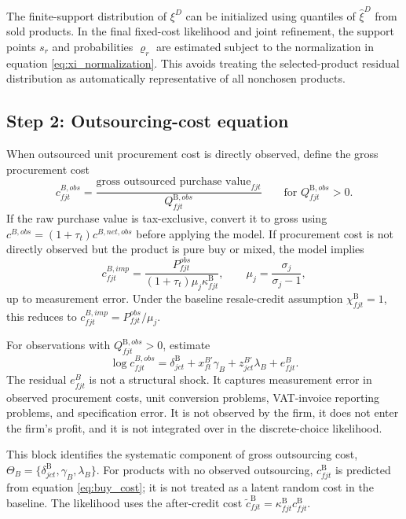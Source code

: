 \documentclass[11pt,a4paper]{article}
\newcommand{\B}{\mathrm{B}}
\begin{document}
The finite-support distribution of $\xi^D$ can be initialized using quantiles of $\widehat\xi^D$ from sold products. In the final fixed-cost likelihood and joint refinement, the support points $s_r$ and probabilities $\varrho_r$ are estimated subject to the normalization in equation \eqref{eq:xi_normalization}. This avoids treating the selected-product residual distribution as automatically representative of all nonchosen products.

\subsection{Step 2: Outsourcing-cost equation}

When outsourced unit procurement cost is directly observed, define the gross procurement cost
\begin{equation}
    c^{B,obs}_{fjt}=\frac{\text{gross outsourced purchase value}_{fjt}}{Q^{\B,obs}_{fjt}}
    \qquad\text{for }Q^{\B,obs}_{fjt}>0.
\end{equation}
If the raw purchase value is tax-exclusive, convert it to gross using $c^{B,obs}=(1+\tau_t)c^{B,net,obs}$ before applying the model. If procurement cost is not directly observed but the product is pure buy or mixed, the model implies
\begin{equation}
    c^{B,imp}_{fjt}
    =\frac{P^{obs}_{fjt}}{(1+\tau_t)\mu_j\kappa^{\B}_{fjt}},
    \qquad \mu_j=\frac{\sigma_j}{\sigma_j-1},
    \label{eq:cB_implied}
\end{equation}
up to measurement error. Under the baseline resale-credit assumption $\chi^{\B}_{fjt}=1$, this reduces to $c^{B,imp}_{fjt}=P^{obs}_{fjt}/\mu_j$.

For observations with $Q^{\B,obs}_{fjt}>0$, estimate
\begin{equation}
    \log c^{B,obs}_{fjt}
    =\delta^{\B}_{jct}
    +x^{B\prime}_{ft}\gamma_B
    +z^{B\prime}_{jct}\lambda_B
    +e^B_{fjt}.
    \label{eq:buy_cost_empirical}
\end{equation}
The residual $e^B_{fjt}$ is not a structural shock. It captures measurement error in observed procurement costs, unit conversion problems, VAT-invoice reporting problems, and specification error. It is not observed by the firm, it does not enter the firm's profit, and it is not integrated over in the discrete-choice likelihood.

This block identifies the systematic component of gross outsourcing cost, $\Theta_B=\{\delta^\B_{jct},\gamma_B,\lambda_B\}$. For products with no observed outsourcing, $c^{\B}_{fjt}$ is predicted from equation \eqref{eq:buy_cost}; it is not treated as a latent random cost in the baseline. The likelihood uses the after-credit cost $\widetilde c^{\B}_{fjt}=\kappa^{\B}_{fjt}c^{\B}_{fjt}$.
\end{document}
